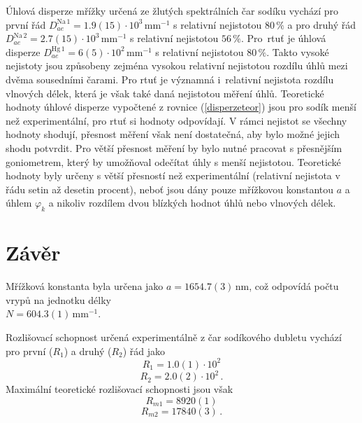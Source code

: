 \documentclass{../concepts/titul_protokol_p/prepareprotokol} %
\begin{document}
Úhlová disperze mřížky určená ze žlutých spektrálních čar sodíku vychází pro první
řád $D^\mathrm{Na\,1}_{ae} = 1.9(15)\cdot 10^3\, \mathrm{mm^{-1}}$ s relativní
nejistotou $80\,\%$ a pro druhý řád $D^\mathrm{Na\,2}_{ae} = 2.7(15)\cdot 10^3\, \mathrm{mm^{-1}}$
s relativní nejistotou $56\,\%$. Pro~rtuť je úhlová disperze 
$D^\mathrm{Hg\,1}_{ae} = 6(5)\cdot 10^2\, \mathrm{mm^{-1}}$ s relativní
nejistotou $80\,\%$.
Takto vysoké nejistoty jsou způsobeny zejména
vysokou relativní nejistotou rozdílu úhlů mezi dvěma sousedními čarami. Pro 
rtuť je významná i~relativní nejistota rozdílu vlnových délek,
která je však také daná nejistotou měření úhlů.
Teoretické hodnoty úhlové disperze vypočtené z rovnice (\ref{disperzeteor})
jsou pro sodík menší než experimentální, pro rtuť si hodnoty odpovídají.
V rámci nejistot se všechny hodnoty shodují, přesnost měření však není
dostatečná, aby bylo možné jejich shodu potvrdit. Pro větší přesnost měření
by bylo nutné pracovat s přesnějším goniometrem, který by umožňoval odečítat
úhly s menší nejistotou. Teoretické hodnoty byly určeny s větší přesností
než experimentální (relativní nejistota v řádu setin až desetin procent),
neboť jsou dány pouze mřížkovou konstantou $a$ a úhlem $\varphi_k$ a nikoliv
rozdílem dvou blízkých hodnot úhlů nebo vlnových délek.

\section{Závěr}

Mřížková konstanta byla určena jako $a = 1654.7(3)\,\mathrm{nm}$, 
což odpovídá počtu vrypů na jednotku délky \\ $N = 604.3(1)\,\mathrm{mm^{-1}}$.

Rozlišovací schopnost určená experimentálně z čar sodíkového dubletu
vychází pro první ($R_1$) a druhý ($R_2$) řád jako
\begin{equation*}
    R_1 = 1.0(1) \cdot 10^2
\end{equation*}
\begin{equation*}
    R_2 = 2.0(2) \cdot 10^2 \, .
\end{equation*}
Maximální teoretické rozlišovací schopnosti jsou však
\begin{equation*}
    R_{m1} = 8920(1)
\end{equation*}
\begin{equation*}
    R_{m2} = 17840(3) \, .
\end{equation*}
\end{document}
